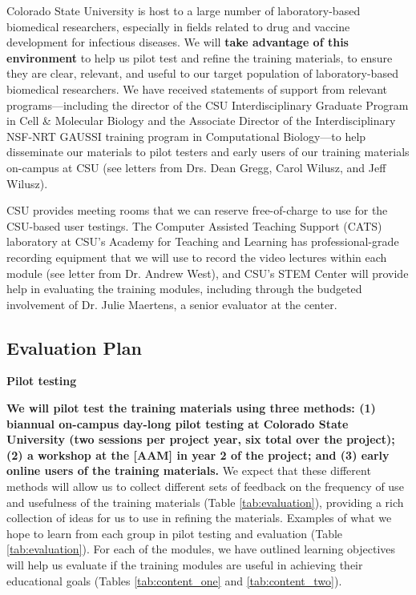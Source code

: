 \documentclass[pdftex,english,11pt,parskip=half]{scrartcl}
\begin{document}
Colorado State University is host to a large number of laboratory-based
biomedical researchers, especially in fields related to drug and vaccine
development for infectious diseases. We will \textbf{take advantage of this
environment} to help us pilot test and refine the training materials, to ensure
they are clear, relevant, and useful to our target population of
laboratory-based biomedical researchers. We have received statements of support
from relevant programs---including the director of the CSU Interdisciplinary
Graduate Program in Cell \& Molecular Biology and the Associate Director of the
Interdisciplinary NSF-NRT GAUSSI training program in Computational Biology---to
help disseminate our materials to pilot testers and early users of our training
materials on-campus at CSU (see letters from Drs. Dean Gregg, Carol Wilusz, and Jeff
Wilusz). 

CSU provides meeting rooms
that we can reserve free-of-charge to use for the CSU-based user testings. The
Computer Assisted Teaching Support (CATS) laboratory at CSU's Academy for
Teaching and Learning has professional-grade recording equipment that we will
use to record the video lectures within each module (see letter from Dr. Andrew
West), and CSU's STEM Center will provide help in evaluating the training modules,
including through the budgeted involvement of Dr. Julie Maertens, a senior
evaluator at the center. 

\subsection{Evaluation Plan}

\textbf{Pilot testing}

\textbf{We will pilot test the training materials using three methods: (1) biannual on-campus  day-long pilot testing at Colorado State University (two sessions per project year, six total over the project); (2) a workshop at the [AAM] in year 2 of the project; and (3) early online users of the training materials.} We expect that these different methods will allow us to collect different sets of 
feedback on the frequency of use and usefulness of the training materials (Table \ref{tab:evaluation}), providing a rich collection of ideas for us to use in refining the materials. Examples of what we hope to learn from each group in pilot testing and evaluation (Table \ref{tab:evaluation}). For each of the modules, we have outlined learning objectives will help us evaluate if the training modules are useful in achieving their educational goals (Tables \ref{tab:content_one} and \ref{tab:content_two}).
\end{document}
